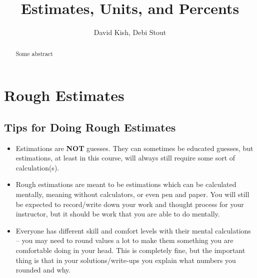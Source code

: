 \documentclass{ximera}
\author{David Kish, Debi Stout}
\title{Estimates, Units, and Percents}
\begin{document}
\begin{abstract}
  Some abstract
\end{abstract}
\maketitle


\section{Rough Estimates}

\begin{tcolorbox}%
\section{Tips for Doing Rough Estimates} 
\begin{itemize}
\item Estimations are \textbf{NOT} guesses.  They can sometimes be educated guesses, but estimations, at least in this course, will always still require some sort of calculation(s).
\item Rough estimations are meant to be estimations which can be calculated mentally, meaning without calculators, or even pen and paper.  You will still be expected to record/write down your work and thought process for your instructor, but it should be work that you are able to do mentally.
\item Everyone has different skill and comfort levels with their mental calculations -- you may need to round values a lot to make them something you are comfortable doing in your head.  This is completely fine, but the important thing is that in your solutions/write-ups you explain what numbers you rounded and why.
\end{itemize}
\end{tcolorbox}
\end{document}

